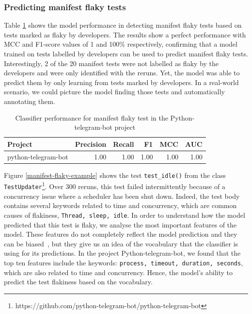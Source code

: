\subsubsection{Predicting manifest flaky tests}

Table \ref{pythonManifestResults} shows the model performance in detecting manifest flaky tests based on tests marked as flaky by developers.
The results show a perfect performance with MCC and F1-score values of 1 and 100\% respectively, confirming that a model trained on tests labelled by developers can be used to predict manifest flaky tests.
Interestingly, 2 of the 20 manifest tests were not labelled as flaky by the developers and were only identified with the reruns.
Yet, the model was able to predict them by only learning from tests marked by developers.
In a real-world scenario, we could picture the model finding those tests and automatically annotating them.

\begin{table}[t!]
\caption{Classifier performance for manifest flaky test in the Python-telegram-bot project}
\label{pythonManifestResults}
\centering
 \begin{tabular}{l|r r r r r} 
 \toprule
 \textbf{Project} & \textbf{Precision} & \textbf{Recall} & \textbf{F1} & \textbf{MCC} & \textbf{AUC} \\ [0.25ex]
 \midrule
 python-telegram-bot & 1.00 & 1.00 & 1.00 & 1.00 & 1.00 \\ 
 \bottomrule
\end{tabular}
\end{table}

Figure \ref{manifest-flaky-example} shows the test \texttt{test\_idle()} from the class \texttt{TestUpdater}\footnote{https://github.com/python-telegram-bot/python-telegram-bot}.
Over 300 reruns, this test failed intermittently because of a concurrency issue where a scheduler has been shut down. 
Indeed, the test body contains several keywords related to time and concurrency, which are common causes of flakiness, \eg \texttt{Thread, sleep, idle}. 
In order to understand how the model predicted that this test is flaky, we analyse the most important features of the model. 
These features do not completely reflect the model prediction and they can be biased~\cite{Permutat82:online}, but they give us an idea of the vocabulary that the classifier is using for its predictions.
In the project Python-telegram-bot, we found that the top ten features include the keywords: \texttt{process, timeout, duration, seconds}, which are also related to time and concurrency.
Hence, the model's ability to predict the test flakiness based on the vocabulary.

